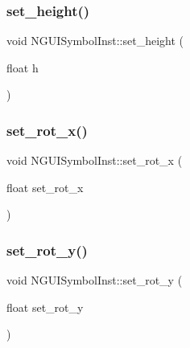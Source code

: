 \hypertarget{class_n_g_u_i_symbol_inst_a5c61ada6b62fe4c7fa1e9308ba62230a}{}\label{class_n_g_u_i_symbol_inst_a5c61ada6b62fe4c7fa1e9308ba62230a} 
\subsubsection{\texorpdfstring{set\+\_\+height()}{set\_height()}}
{\footnotesize\ttfamily void N\+G\+U\+I\+Symbol\+Inst\+::set\+\_\+height (\begin{DoxyParamCaption}\item[{float}]{h }\end{DoxyParamCaption})}

\hypertarget{class_n_g_u_i_symbol_inst_a5ab8b1292bed19938791c692383f186a}{}\label{class_n_g_u_i_symbol_inst_a5ab8b1292bed19938791c692383f186a} 
\subsubsection{\texorpdfstring{set\+\_\+rot\+\_\+x()}{set\_rot\_x()}}
{\footnotesize\ttfamily void N\+G\+U\+I\+Symbol\+Inst\+::set\+\_\+rot\+\_\+x (\begin{DoxyParamCaption}\item[{float}]{set\+\_\+rot\+\_\+x }\end{DoxyParamCaption})}

\hypertarget{class_n_g_u_i_symbol_inst_acaa73863f4b060b82990d2020806ec20}{}\label{class_n_g_u_i_symbol_inst_acaa73863f4b060b82990d2020806ec20} 
\subsubsection{\texorpdfstring{set\+\_\+rot\+\_\+y()}{set\_rot\_y()}}
{\footnotesize\ttfamily void N\+G\+U\+I\+Symbol\+Inst\+::set\+\_\+rot\+\_\+y (\begin{DoxyParamCaption}\item[{float}]{set\+\_\+rot\+\_\+y }\end{DoxyParamCaption})}

